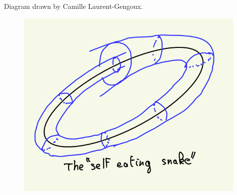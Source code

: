 \documentclass[
aspectratio=3218, 
10pt
]{beamer}
\theoremstyle{plain}
\theoremstyle{remark}
\newtheorem*{remark}{Remarks}
\begin{document}
{
{
Diagram drawn by Camille Laurent-Gengoux.
}
\begin{frame}

\begin{figure}[htbp]
	\centering
		\includegraphics[width=.8\textwidth]{snake.png}
	\label{fig:snake}
\end{figure}
\end{frame}
}

\end{document}
